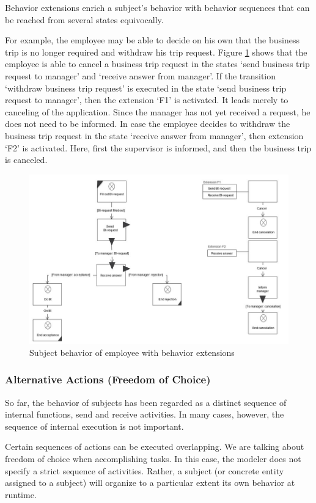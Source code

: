 Behavior extensions enrich a subject’s behavior with behavior sequences that can be reached from several states equivocally.

For example, the employee may be able to decide on his own that the business trip is no longer required and withdraw his trip request. Figure \ref{fig:extension} shows that the employee is able to cancel a business trip request in the states ‘send business trip request to manager’ and ‘receive answer from manager’. If the transition ‘withdraw business trip request’ is executed in the state ‘send business trip request to manager’, then the extension ‘F1’ is activated. It leads merely to canceling of the application. Since the manager has not yet received a request, he does not need to be informed.
\newpage
In case the employee decides to withdraw the business trip request in the state ‘receive answer from manager’, then extension ‘F2’ is activated. Here, first the supervisor is informed, and then the business trip is canceled.

\begin{figure}[ph!]
	\centering
	\includegraphics[width=0.7\linewidth]{20181026-Ontologie-Bilder/Grafiken-Ontologie/SUbjectExecution/Extension}
	\caption[Subject behavior of employee with behavior extensions]{Subject behavior of employee with behavior extensions}
	\label{fig:extension}
\end{figure}

\subsubsection{Alternative Actions (Freedom of Choice)} 
So far, the behavior of subjects has been regarded as a distinct sequence of internal functions, send and receive activities. In many cases, however, the sequence of internal execution is not important.

Certain sequences of actions can be executed overlapping. We are talking about freedom of choice when accomplishing tasks. In this case, the modeler does not specify a strict sequence of activities. Rather, a subject (or concrete entity assigned to a subject) will organize to a particular extent its own behavior at runtime.

